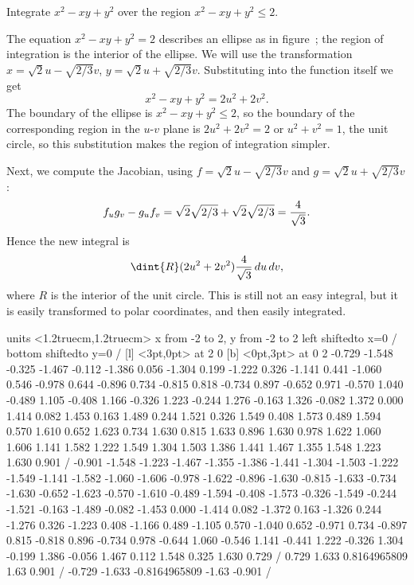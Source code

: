 \begin{example} Integrate $x^2-xy+y^2$ over the region $x^2-xy+y^2\le 2$.

The equation $x^2-xy+y^2= 2$ describes an ellipse as in
figure~; the region of integration is the
interior of the ellipse. We will use the transformation 
$x=\sqrt2 u-\sqrt{2/3}v$, $y=\sqrt2 u+\sqrt{2/3}v$.
Substituting into the function itself we get
$$x^2-xy+y^2=2u^2+2v^2.
$$
The boundary of the ellipse is $x^2-xy+y^2\le 2$, so the boundary of
the corresponding region in the $u$-$v$ plane is $2u^2+2v^2=2$
or $u^2+v^2=1$, the unit circle, so this substitution makes the region
of integration simpler. 

Next, we compute the Jacobian, using $f=\sqrt2 u-\sqrt{2/3}v$ and 
$g=\sqrt2 u+\sqrt{2/3}v$:
$$f_ug_v-g_uf_v=\sqrt2\sqrt{2/3}+\sqrt2\sqrt{2/3}={4\over\sqrt3}.$$
Hence the new integral is 
$$\dint{R} (2u^2+2v^2){4\over\sqrt3}\,du\,dv,$$
where $R$ is the interior of the unit circle.
This is still not an easy integral, but it is easily transformed to
polar coordinates, and then easily integrated.
\label{example:change of variables}
\end{example}

\figure
\vbox{\beginpicture
\normalgraphs
\ninepoint
\setcoordinatesystem units <1.2truecm,1.2truecm> 
\setplotarea x from -2 to 2, y from -2 to 2
\axis left shiftedto x=0 /
\axis bottom shiftedto y=0  /
 [l] <3pt,0pt> at 2 0
 [b] <0pt,3pt> at 0 2
 -0.729 -1.548 -0.325 -1.467 -0.112 -1.386 0.056 -1.304 0.199 
-1.222 0.326 -1.141 0.441 -1.060 0.546 -0.978 0.644 -0.896 0.734 
-0.815 0.818 -0.734 0.897 -0.652 0.971 -0.570 1.040 -0.489 1.105 
-0.408 1.166 -0.326 1.223 -0.244 1.276 -0.163 1.326 -0.082 1.372 
0.000 1.414 0.082 1.453 0.163 1.489 0.244 1.521 0.326 1.549 
0.408 1.573 0.489 1.594 0.570 1.610 0.652 1.623 0.734 1.630 
0.815 1.633 0.896 1.630 0.978 1.622 1.060 1.606 1.141 1.582 
1.222 1.549 1.304 1.503 1.386 1.441 1.467 1.355 1.548 1.223 
1.630 0.901 /
 -0.901 -1.548 -1.223 -1.467 -1.355 -1.386 -1.441 -1.304 -1.503 
-1.222 -1.549 -1.141 -1.582 -1.060 -1.606 -0.978 -1.622 -0.896 -1.630 
-0.815 -1.633 -0.734 -1.630 -0.652 -1.623 -0.570 -1.610 -0.489 -1.594 
-0.408 -1.573 -0.326 -1.549 -0.244 -1.521 -0.163 -1.489 -0.082 -1.453 
0.000 -1.414 0.082 -1.372 0.163 -1.326 0.244 -1.276 0.326 -1.223 
0.408 -1.166 0.489 -1.105 0.570 -1.040 0.652 -0.971 0.734 -0.897 
0.815 -0.818 0.896 -0.734 0.978 -0.644 1.060 -0.546 1.141 -0.441 
1.222 -0.326 1.304 -0.199 1.386 -0.056 1.467 0.112 1.548 0.325 
1.630 0.729 /
 0.729 1.633 0.8164965809 1.63 0.901 /
 -0.729 -1.633 -0.8164965809 -1.63 -0.901 /
\endpicture}

